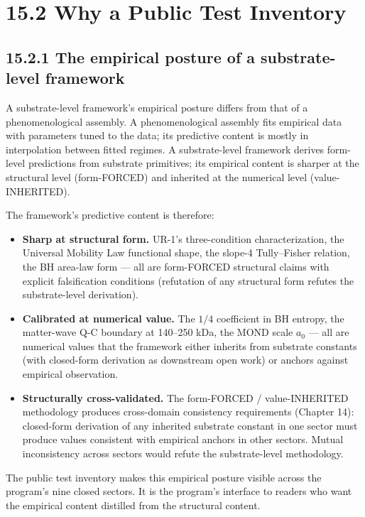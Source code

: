 \documentclass[11pt]{book}
\begin{document}
\section{15.2 Why a Public Test Inventory}

\subsection{15.2.1 The empirical posture of a substrate-level framework}

A substrate-level framework's empirical posture differs from that of a phenomenological assembly. A phenomenological assembly fits empirical data with parameters tuned to the data; its predictive content is mostly in interpolation between fitted regimes. A substrate-level framework derives form-level predictions from substrate primitives; its empirical content is sharper at the structural level (form-FORCED) and inherited at the numerical level (value-INHERITED).

The framework's predictive content is therefore:
\begin{itemize}
\item \textbf{Sharp at structural form.} UR-1's three-condition characterization, the Universal Mobility Law functional shape, the slope-4 Tully–Fisher relation, the BH area-law form — all are form-FORCED structural claims with explicit falsification conditions (refutation of any structural form refutes the substrate-level derivation).
\item \textbf{Calibrated at numerical value.} The $1/4$ coefficient in BH entropy, the matter-wave Q-C boundary at 140–250 kDa, the MOND scale $a_0$ — all are numerical values that the framework either inherits from substrate constants (with closed-form derivation as downstream open work) or anchors against empirical observation.
\item \textbf{Structurally cross-validated.} The form-FORCED / value-INHERITED methodology produces cross-domain consistency requirements (Chapter 14): closed-form derivation of any inherited substrate constant in one sector must produce values consistent with empirical anchors in other sectors. Mutual inconsistency across sectors would refute the substrate-level methodology.
\end{itemize}

The public test inventory makes this empirical posture visible across the program's nine closed sectors. It is the program's interface to readers who want the empirical content distilled from the structural content.
\end{document}

